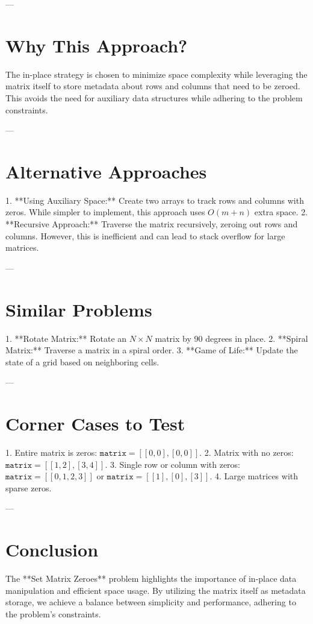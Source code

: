 ---

\section*{Why This Approach?}
The in-place strategy is chosen to minimize space complexity while leveraging the matrix itself to store metadata about rows and columns that need to be zeroed. This avoids the need for auxiliary data structures while adhering to the problem constraints.

---

\section*{Alternative Approaches}
1. **Using Auxiliary Space:** Create two arrays to track rows and columns with zeros. While simpler to implement, this approach uses \(O(m + n)\) extra space.
2. **Recursive Approach:** Traverse the matrix recursively, zeroing out rows and columns. However, this is inefficient and can lead to stack overflow for large matrices.

---

\section*{Similar Problems}
1. **Rotate Matrix:** Rotate an \(N \times N\) matrix by 90 degrees in place.
2. **Spiral Matrix:** Traverse a matrix in a spiral order.
3. **Game of Life:** Update the state of a grid based on neighboring cells.

---

\section*{Corner Cases to Test}
1. Entire matrix is zeros: \(\texttt{matrix} = [[0, 0], [0, 0]]\).
2. Matrix with no zeros: \(\texttt{matrix} = [[1, 2], [3, 4]]\).
3. Single row or column with zeros: \(\texttt{matrix} = [[0, 1, 2, 3]]\) or \(\texttt{matrix} = [[1], [0], [3]]\).
4. Large matrices with sparse zeros.

---

\section*{Conclusion}
The **Set Matrix Zeroes** problem highlights the importance of in-place data manipulation and efficient space usage. By utilizing the matrix itself as metadata storage, we achieve a balance between simplicity and performance, adhering to the problem's constraints.